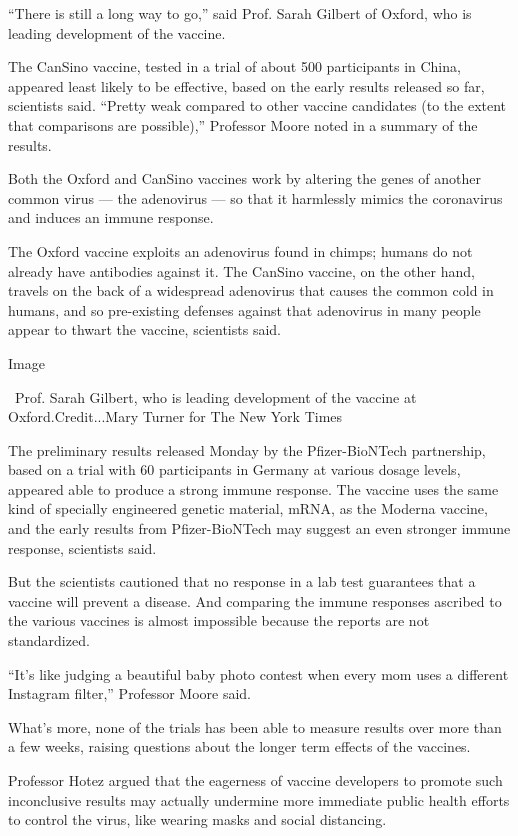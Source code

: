 ``There is still a long way to go,'' said Prof. Sarah Gilbert of Oxford,
who is leading development of the vaccine.

The CanSino vaccine, tested in a trial of about 500 participants in
China, appeared least likely to be effective, based on the early results
released so far, scientists said. ``Pretty weak compared to other
vaccine candidates (to the extent that comparisons are possible),''
Professor Moore noted in a summary of the results.

Both the Oxford and CanSino vaccines work by altering the genes of
another common virus --- the adenovirus --- so that it harmlessly mimics
the coronavirus and induces an immune response.

The Oxford vaccine exploits an adenovirus found in chimps; humans do not
already have antibodies against it. The CanSino vaccine, on the other
hand, travels on the back of a widespread adenovirus that causes the
common cold in humans, and so pre-existing defenses against that
adenovirus in many people appear to thwart the vaccine, scientists said.

Image

~Prof. Sarah Gilbert, who is leading development of the vaccine at
Oxford.Credit...Mary Turner for The New York Times

The preliminary results released Monday by the Pfizer-BioNTech
partnership, based on a trial with 60 participants in Germany at various
dosage levels, appeared able to produce a strong immune response. The
vaccine uses the same kind of specially engineered genetic material,
mRNA, as the Moderna vaccine, and the early results from Pfizer-BioNTech
may suggest an even stronger immune response, scientists said.

But the scientists cautioned that no response in a lab test guarantees
that a vaccine will prevent a disease. And comparing the immune
responses ascribed to the various vaccines is almost impossible because
the reports are not standardized.

``It's like judging a beautiful baby photo contest when every mom uses a
different Instagram filter,'' Professor Moore said.

What's more, none of the trials has been able to measure results over
more than a few weeks, raising questions about the longer term effects
of the vaccines.

Professor Hotez argued that the eagerness of vaccine developers to
promote such inconclusive results may actually undermine more immediate
public health efforts to control the virus, like wearing masks and
social distancing.

